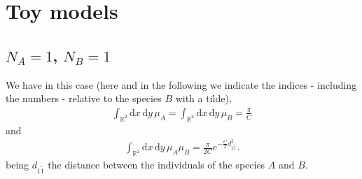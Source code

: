 \documentclass[12pt]{article}
\newcommand{\xd}{\mathrm{d}}
\numberwithin{equation}{section} %
\numberwithin{figure}{section} %
\theoremstyle{definition}
\begin{document}
\section{Toy models}
\subsection{\texorpdfstring{$N_A=1$}{NA=1}, \texorpdfstring{$N_B=1$}{NB=1}}
We have in this case (here and in the following we indicate the indices - including the numbers - relative to the species $B$ with a tilde),
\begin{align}
\int_{{\mathbb R}^2} \xd x \, \xd y \, \mu_A = \int_{{\mathbb R}^2} \xd x \, \xd y \, \mu_B =  \frac{\pi}{C}
\end{align}
and
\begin{align}
\int_{{\mathbb R}^2} \xd x \, \xd y \, \mu_A \mu_B =  \frac{\pi}{2C} e^{- \frac{C}{2}d^2_{1\tilde{1}}}.
\end{align}
being $d_{1\tilde{1}}$ the distance between the individuals of the species $A$ and $B$.
\end{document}
